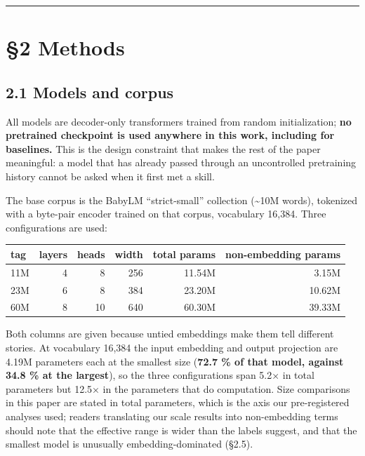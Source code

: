 \documentclass[11pt]{article}
\begin{document}
\begin{center}\rule{0.5\linewidth}{0.5pt}\end{center}

\section{§2 Methods}\label{methods}

\subsection{2.1 Models and corpus}\label{models-and-corpus}

All models are decoder-only transformers trained from random initialization; \textbf{no pretrained
checkpoint is used anywhere in this work, including for baselines.} This is the design
constraint that makes the rest of the paper meaningful: a model that has already passed
through an uncontrolled pretraining history cannot be asked when it first met a skill.

The base corpus is the BabyLM ``strict-small'' collection (\textasciitilde10M words), tokenized with a
byte-pair encoder trained on that corpus, vocabulary 16,384. Three configurations are used:

\begin{table}[t]
\centering\small
\begin{tabular}{@{}lrrrrr@{}}
\toprule\noalign{}
tag & layers & heads & width & total params & non-embedding params \\
\midrule\noalign{}

11M & 4 & 8 & 256 & 11.54M & 3.15M \\
23M & 6 & 8 & 384 & 23.20M & 10.62M \\
60M & 8 & 10 & 640 & 60.30M & 39.33M \\
\bottomrule
\end{tabular}
\end{table}


Both columns are given because untied embeddings make them tell different stories. At
vocabulary 16,384 the input embedding and output projection are 4.19M parameters each at the
smallest size (\textbf{72.7 \% of that model, against 34.8 \% at the largest}), so the three
configurations span 5.2× in total parameters but 12.5× in the parameters that do computation.
Size comparisons in this paper are stated in total parameters, which is the axis our
pre-registered analyses used; readers translating our scale results into non-embedding terms
should note that the effective range is wider than the labels suggest, and that the smallest
model is unusually embedding-dominated (§2.5).
\end{document}

